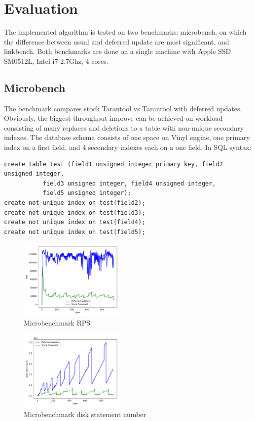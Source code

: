 \documentclass{vldb}
\begin{document}
\section{Evaluation}

The implemented algorithm is tested on two benchmarks: microbench, on which the
difference between usual and deferred update are most significant, and
linkbench. Both benchmarks are done on a single machine with Apple SSD SM0512L,
Intel i7 2.7Ghz, 4 cores.

\subsection{Microbench}

The benchmark compares stock Tarantool vs Tarantool with deferred updates.
Obviously, the biggest throughput improve can be achieved on workload consisting
of many replaces and deletions to a table with non-unique secondary indexes.
The database schema consists of one space on Vinyl engine, one primary index on
a first field, and 4 secondary indexes each on a one field. In SQL syntax:
\begin{verbatim}
create table test (field1 unsigned integer primary key, field2 unsigned integer,
		   field3 unsigned integer, field4 unsigned integer,
		   field5 unsigned integer);
create not unique index on test(field2);
create not unique index on test(field3);
create not unique index on test(field4);
create not unique index on test(field5);
\end{verbatim}

\begin{figure}
\centering
\includegraphics[width=0.46\textwidth]{rps_microbench}
\caption{Microbenchmark RPS}
\label{fig:rps_microbench}
\end{figure}

\begin{figure}
\centering
\includegraphics[width=0.46\textwidth]{disk_stmt_microbench}
\caption{Microbenchmark disk statement number}
\label{fig:disk_stmt_microbench}
\end{figure}
\end{document}

